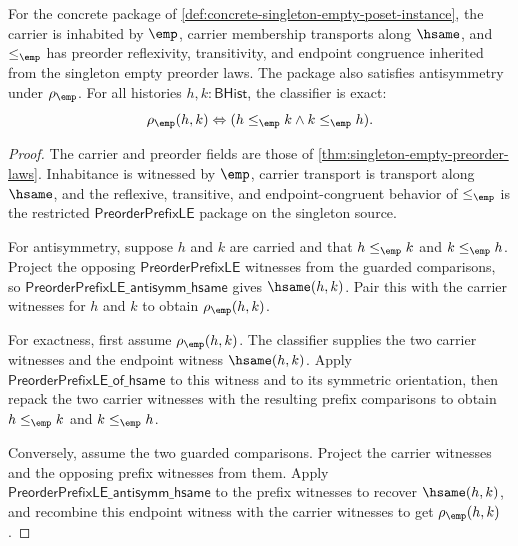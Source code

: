 \begin{theorem}
\label{thm:singleton-empty-poset-laws}
For the concrete package of
\autoref{def:concrete-singleton-empty-poset-instance}, the carrier is
inhabited by $\emp$, carrier membership transports along $\hsame$, and
$\le_{\emp}$ has preorder reflexivity, transitivity, and endpoint congruence
inherited from the singleton empty preorder laws. The package also satisfies
antisymmetry under $\rho_{\emp}$. For all histories $h,k:\mathsf{BHist}$, the
classifier is exact:
$$
\rho_{\emp}(h,k)\Leftrightarrow
(h\le_{\emp}k\land k\le_{\emp}h).
$$
\end{theorem}
\begin{proof}
The carrier and preorder fields are those of
\autoref{thm:singleton-empty-preorder-laws}. Inhabitance is witnessed by
$\emp$, carrier transport is transport along $\hsame$, and the reflexive,
transitive, and endpoint-congruent behavior of $\le_{\emp}$ is the restricted
$\mathsf{PreorderPrefixLE}$ package on the singleton source.

For antisymmetry, suppose $h$ and $k$ are carried and that
$h\le_{\emp}k$ and $k\le_{\emp}h$. Project the opposing
$\mathsf{PreorderPrefixLE}$ witnesses from the guarded comparisons, so
$\mathsf{PreorderPrefixLE\_antisymm\_hsame}$ gives $\hsame(h,k)$. Pair this
with the carrier witnesses for $h$ and $k$ to obtain $\rho_{\emp}(h,k)$.

For exactness, first assume $\rho_{\emp}(h,k)$. The classifier supplies the
two carrier witnesses and the endpoint witness $\hsame(h,k)$. Apply
$\mathsf{PreorderPrefixLE\_of\_hsame}$ to this witness and to its symmetric
orientation, then repack the two carrier witnesses with the resulting prefix
comparisons to obtain $h\le_{\emp}k$ and $k\le_{\emp}h$.

Conversely, assume the two guarded comparisons. Project the carrier witnesses
and the opposing prefix witnesses from them. Apply
$\mathsf{PreorderPrefixLE\_antisymm\_hsame}$ to the prefix witnesses to recover
$\hsame(h,k)$, and recombine this endpoint witness with the carrier witnesses
to get $\rho_{\emp}(h,k)$.
\end{proof}

